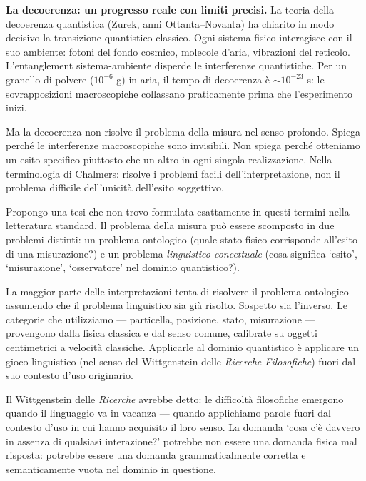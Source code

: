 \documentclass[12pt,a4paper,openany]{book}
\newcommand{\sezione}[1]{\vspace{1.2em}{\large\bfseries #1}\vspace{0.5em}\par}
\begin{document}
\textbf{La decoerenza: un progresso reale con limiti precisi.} La teoria della decoerenza quantistica (Zurek, anni Ottanta--Novanta) ha chiarito in modo decisivo la transizione quantistico-classico. Ogni sistema fisico interagisce con il suo ambiente: fotoni del fondo cosmico, molecole d'aria, vibrazioni del reticolo. L'entanglement sistema-ambiente disperde le interferenze quantistiche. Per un granello di polvere ($10^{-6}$ g) in aria, il tempo di decoerenza è $\sim 10^{-23}$ s: le sovrapposizioni macroscopiche collassano praticamente prima che l'esperimento inizi.

Ma la decoerenza non risolve il problema della misura nel senso profondo. Spiega perché le interferenze macroscopiche sono invisibili. Non spiega perché otteniamo un esito specifico piuttosto che un altro in ogni singola realizzazione. Nella terminologia di Chalmers: risolve i problemi facili dell'interpretazione, non il problema difficile dell'unicità dell'esito soggettivo.

\sezione{Una tesi originale: il problema della misura come problema linguistico-ontologico}

Propongo una tesi che non trovo formulata esattamente in questi termini nella letteratura standard. Il problema della misura può essere scomposto in due problemi distinti: un problema ontologico (quale stato fisico corrisponde all'esito di una misurazione?) e un problema \textit{linguistico-concettuale} (cosa significa `esito', `misurazione', `osservatore' nel dominio quantistico?).

La maggior parte delle interpretazioni tenta di risolvere il problema ontologico assumendo che il problema linguistico sia già risolto. Sospetto sia l'inverso. Le categorie che utilizziamo — particella, posizione, stato, misurazione — provengono dalla fisica classica e dal senso comune, calibrate su oggetti centimetrici a velocità classiche. Applicarle al dominio quantistico è applicare un gioco linguistico (nel senso del Wittgenstein delle \textit{Ricerche Filosofiche}) fuori dal suo contesto d'uso originario.

Il Wittgenstein delle \textit{Ricerche} avrebbe detto: le difficoltà filosofiche emergono quando il linguaggio va in vacanza — quando applichiamo parole fuori dal contesto d'uso in cui hanno acquisito il loro senso. La domanda `cosa c'è davvero in assenza di qualsiasi interazione?' potrebbe non essere una domanda fisica mal risposta: potrebbe essere una domanda grammaticalmente corretta e semanticamente vuota nel dominio in questione.
\end{document}

